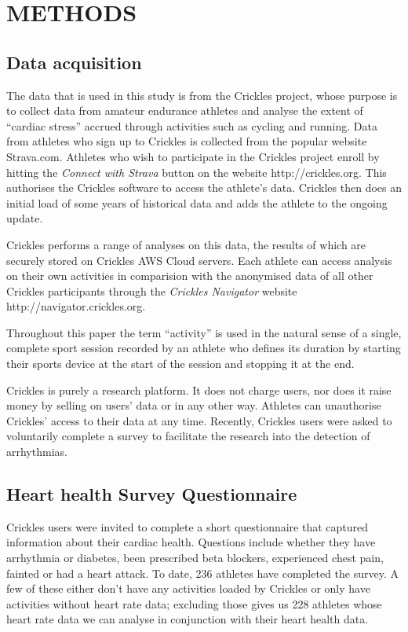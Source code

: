 \documentclass[
  letterpaper,
  DIV=11,
  numbers=noendperiod]{scrartcl}
\begin{document}
\section{METHODS}\label{methods-1}

\subsection{Data acquisition}\label{data-acquisition}

The data that is used in this study is from the Crickles project, whose
purpose is to collect data from amateur endurance athletes and analyse
the extent of ``cardiac stress'' accrued through activities such as
cycling and running. Data from athletes who sign up to Crickles is
collected from the popular website Strava.com. Athletes who wish to
participate in the Crickles project enroll by hitting the \emph{Connect
with Strava} button on the website http://crickles.org. This authorises
the Crickles software to access the athlete's data. Crickles then does
an initial load of some years of historical data and adds the athlete to
the ongoing update.

Crickles performs a range of analyses on this data, the results of which
are securely stored on Crickles AWS Cloud servers. Each athlete can
access analysis on their own activities in comparision with the
anonymised data of all other Crickles participants through the
\emph{Crickles Navigator} website http://navigator.crickles.org.

Throughout this paper the term ``activity'' is used in the natural sense
of a single, complete sport session recorded by an athlete who defines
its duration by starting their sports device at the start of the session
and stopping it at the end.

Crickles is purely a research platform. It does not charge users, nor
does it raise money by selling on users' data or in any other way.
Athletes can unauthorise Crickles' access to their data at any time.
Recently, Crickles users were asked to voluntarily complete a survey to
facilitate the research into the detection of arrhythmias.

\subsection{Heart health Survey
Questionnaire}\label{heart-health-survey-questionnaire}

Crickles users were invited to complete a short questionnaire that
captured information about their cardiac health. Questions include
whether they have arrhythmia or diabetes, been prescribed beta blockers,
experienced chest pain, fainted or had a heart attack. To date, 236
athletes have completed the survey. A few of these either don't have any
activities loaded by Crickles or only have activities without heart rate
data; excluding those gives us 228 athletes whose heart rate data we can
analyse in conjunction with their heart health data.
\end{document}
